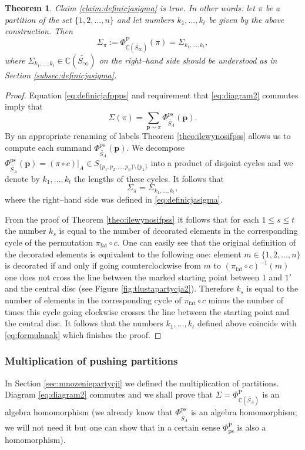 \documentclass[12pt,dvips]{amsart}
\numberwithin{equation}{section} \numberwithin{figure}{section}
\theoremstyle{plain}
\newtheorem{theorem}[lemma]{Theorem}
\theoremstyle{definition}
\theoremstyle{remark}
\newcommand{\ppp}{{\mathbf{p}}}
\newcommand{\C}{{\mathbb{C}}}
\newcommand{\Sn}[1]{{{S}}_{#1}}
\newcommand{\fpss}{\Phi^{\ps}_{\PartPerm{A}}}
\newcommand{\fpps}{\Phi^{\pp}_{\C(\PartPerm{A})}}
\newcommand{\fppsinf}{\Phi^{\pp}_{\C(\PartPerm{\infty})}}
\newcommand{\fppps}{\Phi^{\pp}_{\ps}}
\newcommand{\PartPerm}[1]{\widetilde{\Sn{#1}}}
\DeclareMathOperator{\fat}{fat}
\DeclareMathOperator{\ps}{ps}
\DeclareMathOperator{\pp}{P}
\begin{document}
\begin{theorem}
\label{theo:stwierdzeniepierwszejestprawda} Claim
\ref{claim:definicjasigma} is true. In other words: let $\pi$ be a
partition of the set $\{1,2,\dots,n\}$ and let numbers
$k_1,\dots,k_t$ be given by the above construction. Then
$$\Sigma_\pi:=\fppsinf(\pi)=\Sigma_{k_1,\dots,k_t},$$
where $\Sigma_{k_1,\dots,k_t}\in\C(\PartPerm{\infty})$ on the
right--hand side should be understood as in Section
\ref{subsec:definicjasigma}.
\end{theorem}
\begin{proof}
Equation \eqref{eq:definicjafppps} and requirement that
\eqref{eq:diagram2} commutes imply that
$$\Sigma(\pi)=\sum_{\ppp\sim\pi} \fpss(\ppp).$$
By an appropriate renaming of labels Theorem
\ref{theo:ilewynosifpss} allows us to compute each summand
$\fpss(\ppp)$. We decompose $\fpss(\ppp)=(\pi\circ c)|_A
\in\Sn{\{p_1,p_2,\dots,p_n\} \setminus\{p_1\} }$ into a product of
disjoint cycles and we denote by $k_1,\dots,k_t$ the lengths of
these cycles. It follows that
$$\Sigma_{\pi}=\Sigma_{k_1,\dots,k_t},$$
where the right--hand side was defined in \eqref{eq:definicjasigma}.

From the proof of Theorem \ref{theo:ilewynosifpss} it follows that
for each $1\leq s\leq t$ the number $k_s$ is equal to the number of
decorated elements in the corresponding cycle of the permutation
$\pi_{\fat}\circ c$. One can easily see that the original definition
of the decorated elements is equivalent to the following one:
element $m\in\{1,2,\dots,n\}$ is decorated if and only if going
counterclockwise from $m$ to $(\pi_{\fat}\circ c)^{-1}(m)$ one does
not cross the line between the marked starting point between $1$ and
$1'$ and the central disc (see Figure \ref{fig:tlustapartycja2}).
Therefore $k_s$ is equal to the number of elements in the
corresponding cycle of $\pi_{\fat}\circ c$ minus the number of times
this cycle going clockwise crosses the line between the starting
point and the central disc. It follows that the numbers
$k_1,\dots,k_t$ defined above coincide with \eqref{eq:formulanak}
which finishes the proof.
\end{proof}



\subsubsection{Multiplication of pushing partitions} In Section
\ref{sec:mnozeniepartycji} we defined the multiplication of
partitions. Diagram \eqref{eq:diagram2} commutes and we shall prove
that $\Sigma=\fpps$ is an algebra homomorphism (we already know that
$\fpss$ is an algebra homomorphism; we will not need it but one can
show that in a certain sense $\fppps$ is also a homomorphism).
\end{document}
